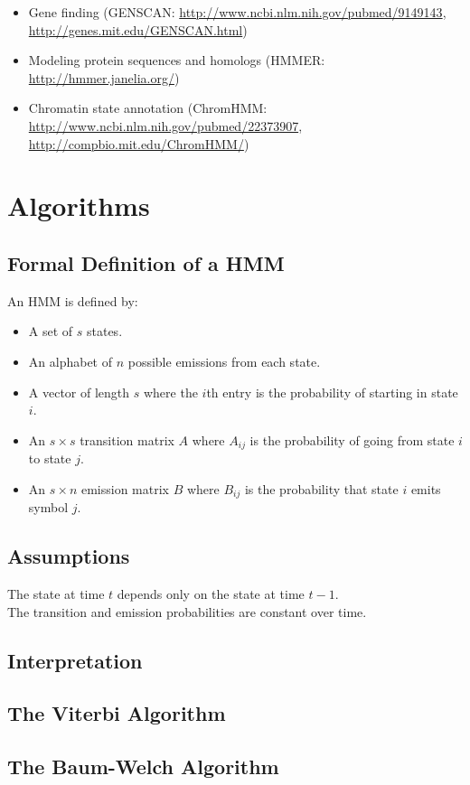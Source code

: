 \documentclass[11pt, oneside]{article}
\begin{document}
\begin{itemize}
\item Gene finding (GENSCAN: \url{http://www.ncbi.nlm.nih.gov/pubmed/9149143}, \url{http://genes.mit.edu/GENSCAN.html})
\item Modeling protein sequences and homologs (HMMER: \url{http://hmmer.janelia.org/})
\item Chromatin state annotation (ChromHMM: \url{http://www.ncbi.nlm.nih.gov/pubmed/22373907}, \url{http://compbio.mit.edu/ChromHMM/})
\end{itemize}

\section{Algorithms}
\subsection{Formal Definition of a HMM}
An HMM is defined by:
\begin{itemize}
\item A set of $s$ states.
\item An alphabet of $n$ possible emissions from each state.
\item A vector of length $s$ where the $i$th entry is the probability of starting in state $i$.
\item An $s\times s$ transition matrix $A$ where $A_{ij}$ is the probability of going from state $i$ to state $j$.
\item An $s \times n$ emission matrix $B$ where $B_{ij}$ is the probability that state $i$ emits symbol $j$.
\end{itemize}

\subsection{Assumptions}
The state at time $t$ depends only on the state at time $t-1$.\\
The transition and emission probabilities are constant over time.
\subsection{Interpretation}
\subsection{The Viterbi Algorithm}
\subsection{The Baum-Welch Algorithm}
\end{document}
